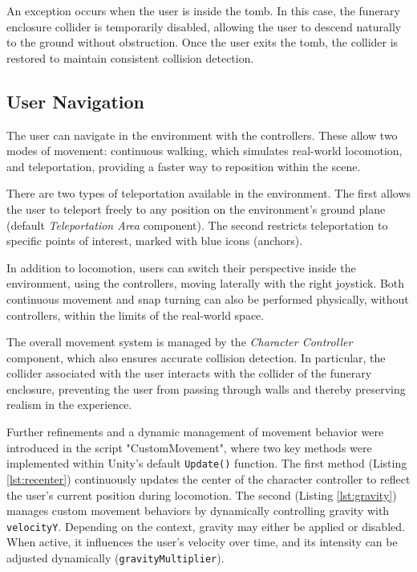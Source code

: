 An exception occurs when the user is inside the tomb. In this case, the funerary enclosure collider is temporarily disabled, allowing the user to descend naturally to the ground without obstruction. Once the user exits the tomb, the collider is restored to maintain consistent collision detection.

\subsection{User Navigation}
\label{sec:user_navigation}

The user can navigate in the environment with the controllers. 
These allow two modes of movement: continuous walking, which simulates real-world locomotion, and teleportation, providing a faster way to reposition within the scene.

There are two types of teleportation available in the environment. The first allows the user to teleport freely to any position on the environment’s ground plane (default \emph{Teleportation Area} component). The second restricts teleportation to specific points of interest, marked with blue icons (anchors).

In addition to locomotion, users can switch their perspective inside the environment, using the controllers, moving laterally with the right joystick.
Both continuous movement and snap turning can also be performed physically, without controllers, within the limits of the real-world space.

The overall movement system is managed by the \emph{Character Controller} component, which also ensures accurate collision detection. In particular, the collider associated with the user interacts with the collider of the funerary enclosure, preventing the user from passing through walls and thereby preserving realism in the experience.

Further refinements and a dynamic management of movement behavior were introduced in the script "CustomMovement", where two key methods were implemented within Unity’s default \texttt{Update()} function.
The first method (Listing \ref{lst:recenter}) continuously updates the center of the character controller to reflect the user’s current position during locomotion. 
The second (Listing \ref{lst:gravity}) manages custom movement behaviors by dynamically controlling gravity with \texttt{velocityY}. 
Depending on the context, gravity may either be applied or disabled. When active, it influences the user’s velocity over time, and its intensity can be adjusted dynamically (\texttt{gravityMultiplier}).

